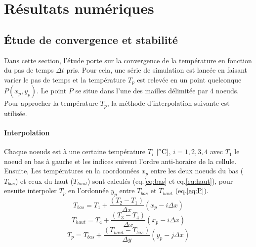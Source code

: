 \documentclass[a4paper,12pt,oneside]{article}
\def \be {\begin{equation}}
\def \ee {\end{equation}}
\def \dd  {{\rm d}}
\begin{document}




\section{Résultats numériques}

\subsection{Étude de convergence et stabilité}
Dans cette section, l'étude porte sur la convergence de la température en fonction du pas de temps $\Delta t$ pris. Pour cela, une série de simulation est lancée en faisant varier le pas de temps et la température $T_p$ est relevée en un point quelconque $P(x_p,y_p)$. Le point $P$ se situe dans l'une des mailles délimitée par 4 noeuds. Pour approcher la température $T_p$, la méthode d'interpolation suivante est utilisée.


\paragraph{Interpolation}

Chaque noeuds est à une certaine température $T_i$ $\rm [^{\circ} C]$, $i=1,2,3,4$ avec $T_1$ le noeud en bas à gauche et les indices suivent l'ordre anti-horaire de la cellule. Ensuite, Les températures en la coordonnées $x_p$ entre les deux noeuds du bas ($T_{bas}$) et ceux du haut ($T_{haut}$) sont calculés (eq.\ref{eq:bas} et eq.\ref{eq:haut}), pour ensuite interpoler $T_p$ en l'ordonnée $y_p$ entre $T_{bas}$ et $T_{haut}$ (eq.\ref{eq:P}).
\begin{equation}
    T_{bas}=T_1+\frac{(T_2-T_1)}{\Delta x}(x_p-i\Delta x)
    \label{eq:bas}
\end{equation}
 \begin{equation}
T_{haut}=T_4+\frac{(T_3-T_4)}{\Delta x}(x_p-i\Delta x)
\label{eq:haut}
 \end{equation}
 \begin{equation}
 T_p=T_{bas}+\frac{(T_{haut}-T_{bas})}{\Delta y}(y_p-j\Delta x)
 \label{eq:P}
 \end{equation}
\end{document}
